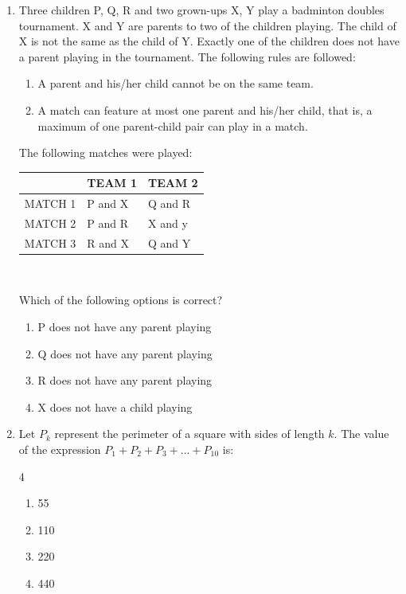 \begin{enumerate}[label=\thesubsection.\arabic*,ref=\thesubsection.\theenumi]
\item Three children P, Q, R and two grown-ups X, Y play a badminton doubles
tournament. X and Y are parents to two of the children playing. The child of X is
not the same as the child of Y. Exactly one of the children does not have a parent
playing in the tournament. The following rules are followed:
	\begin{enumerate}[label=\roman*]
		\item A parent and his/her child cannot be on the same team.
		\item A match can feature at most one parent and his/her child, that is, a
maximum of one parent-child pair can play in a match.
	\end{enumerate}
The following matches were played:\\
	\begin{tabular}{|l|l|l|}
		\hline
		&TEAM 1&TEAM 2\\\hline
		MATCH 1&P and X&Q and R\\\hline
		MATCH 2&P and R&X and y\\\hline
		MATCH 3&R and X&Q and Y\\\hline
	\end{tabular}\\
\par Which of the following options is correct?

\begin{enumerate}
	\item P does not have any parent playing
	\item Q does not have any parent playing
	\item R does not have any parent playing
	\item X does not have a child playing
\end{enumerate}
			


\item Let $P_k$ represent the perimeter of a square with sides of length $k$. The value of the
	expression $P_1 + P_2 + P_3 + ...+ P_{10}$ is:
	
	\begin{multicols}{4}
	\begin{enumerate}
		\item 55
		\item 110
		\item 220
		\item 440
	\end{enumerate}
	\end{multicols}






\end{enumerate}
